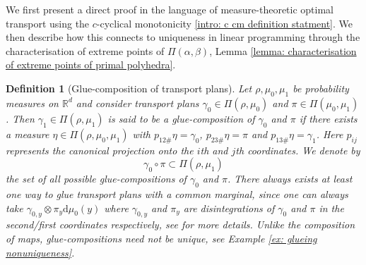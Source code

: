 \documentclass[11pt, oneside, titlepage]{book}
\theoremstyle{plain}
\newtheorem{definition}[theorem]{Definition}
\theoremstyle{definition}
\newcommand{\R}{\mathbb{R}}
\newcommand{\di}{\mathrm{d}}
\begin{document}
We first present a direct proof in the language of measure-theoretic optimal transport using the $c$-cyclical monotonicity \eqref{intro: c cm definition statment}. We then describe how this connects to uniqueness in linear programming through the characterisation of extreme points of $\Pi(\alpha, \beta)$, Lemma \ref{lemma: characterisation of extreme points of primal polyhedra}.

\begin{definition}[Glue-composition of transport plans]
    Let $\rho, \mu_0, \mu_1$ be probability measures on $\R^d$ and consider transport plans $\gamma_0 \in \Pi(\rho, \mu_0)$ and $\pi \in \Pi(\mu_0, \mu_1)$. Then $\gamma_1 \in \Pi(\rho, \mu_1)$ is said to be a \textit{glue-composition} of $\gamma_0$ and $\pi$ if there exists a measure $\eta \in \Pi(\rho, \mu_0, \mu_1)$ with $p_{12\#}\eta = \gamma_0$, $p_{23\#}\eta = \pi$ and $p_{13\#}\eta = \gamma_1$. Here $p_{ij}$ represents the canonical projection onto the $i$th and $j$th coordinates. 
    We denote by
    \begin{equation*}
        \gamma_0 \circ \pi \subset \Pi(\rho, \mu_1)
    \end{equation*}
    the set of all possible glue-compositions of $\gamma_0$ and $\pi$. There always exists at least one way to glue transport plans with a common marginal, since one can always take $\gamma_{0, y} \otimes \pi_y \di \mu_0(y)$ where $\gamma_{0, y}$ and $\pi_y$ are disintegrations of $\gamma_0$ and $\pi$ in the second/first coordinates respectively, see \cite[Lemma 5.5]{santambrogio2015optimal} for more details. Unlike the composition of maps, glue-compositions need not be unique, see Example \ref{ex: glueing nonuniqueness}.
\end{definition}
\end{document}
